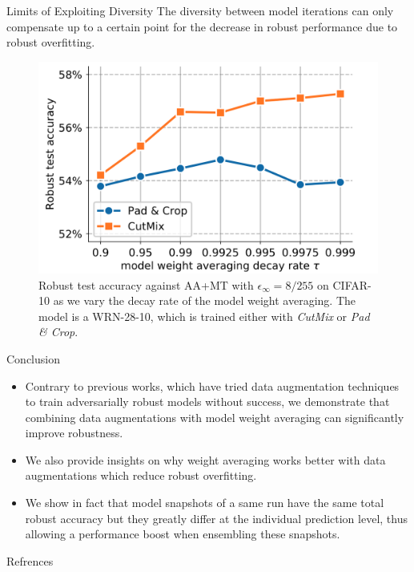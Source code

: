 \begin{frame}{Limits of Exploiting Diversity}
The diversity between model iterations can only compensate up to a certain point for the decrease in robust performance due to robust overfitting.
    \begin{figure}
            \centering
            \includegraphics[width=0.5\linewidth]{pic/fig 8.png}
            \caption{Robust test accuracy against AA+MT with $\epsilon_\infty = 8/255$ on CIFAR-10 as we vary the decay rate of the model weight averaging. The model is a WRN-28-10, which is trained either with \textit{CutMix} or \textit{Pad \& Crop}.}
            \label{fig:fig8}
    \end{figure}
\end{frame}

\begin{frame}{Conclusion}
    \begin{itemize}
        \item Contrary to previous works, which have tried data augmentation techniques to train adversarially robust models without success, we demonstrate that combining data augmentations with model weight averaging can significantly improve robustness.
        \item We also provide insights on why weight averaging works better with data augmentations which reduce robust overfitting.
        \item We show in fact that model snapshots of a same run have the same total robust accuracy but they greatly differ at the individual prediction level, thus allowing a performance boost when ensembling these snapshots.
    \end{itemize}
\end{frame}


\begin{frame}{Refrences}
    
    
    \nocite{*}
\end{frame}